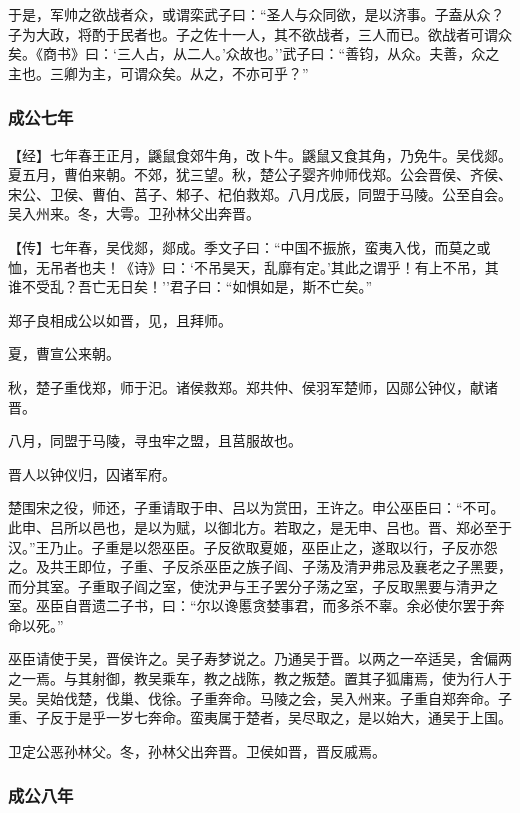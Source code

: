 \documentclass[]{article}
\begin{document}
于是，军帅之欲战者众，或谓栾武子曰：``圣人与众同欲，是以济事。子盍从众？子为大政，将酌于民者也。子之佐十一人，其不欲战者，三人而已。欲战者可谓众矣。《商书》曰：`三人占，从二人。'众故也。''武子曰：``善钧，从众。夫善，众之主也。三卿为主，可谓众矣。从之，不亦可乎？''

\hypertarget{header-n1612}{%
\subsubsection{成公七年}\label{header-n1612}}

【经】七年春王正月，鼷鼠食郊牛角，改卜牛。鼷鼠又食其角，乃免牛。吴伐郯。夏五月，曹伯来朝。不郊，犹三望。秋，楚公子婴齐帅师伐郑。公会晋侯、齐侯、宋公、卫侯、曹伯、莒子、邾子、杞伯救郑。八月戊辰，同盟于马陵。公至自会。吴入州来。冬，大雩。卫孙林父出奔晋。

【传】七年春，吴伐郯，郯成。季文子曰：``中国不振旅，蛮夷入伐，而莫之或恤，无吊者也夫！《诗》曰：`不吊昊天，乱靡有定。'其此之谓乎！有上不吊，其谁不受乱？吾亡无日矣！''君子曰：``如惧如是，斯不亡矣。''

郑子良相成公以如晋，见，且拜师。

夏，曹宣公来朝。

秋，楚子重伐郑，师于汜。诸侯救郑。郑共仲、侯羽军楚师，囚郧公钟仪，献诸晋。

八月，同盟于马陵，寻虫牢之盟，且莒服故也。

晋人以钟仪归，囚诸军府。

楚围宋之役，师还，子重请取于申、吕以为赏田，王许之。申公巫臣曰：``不可。此申、吕所以邑也，是以为赋，以御北方。若取之，是无申、吕也。晋、郑必至于汉。''王乃止。子重是以怨巫臣。子反欲取夏姬，巫臣止之，遂取以行，子反亦怨之。及共王即位，子重、子反杀巫臣之族子阎、子荡及清尹弗忌及襄老之子黑要，而分其室。子重取子阎之室，使沈尹与王子罢分子荡之室，子反取黑要与清尹之室。巫臣自晋遗二子书，曰：``尔以谗慝贪婪事君，而多杀不辜。余必使尔罢于奔命以死。''

巫臣请使于吴，晋侯许之。吴子寿梦说之。乃通吴于晋。以两之一卒适吴，舍偏两之一焉。与其射御，教吴乘车，教之战陈，教之叛楚。置其子狐庸焉，使为行人于吴。吴始伐楚，伐巢、伐徐。子重奔命。马陵之会，吴入州来。子重自郑奔命。子重、子反于是乎一岁七奔命。蛮夷属于楚者，吴尽取之，是以始大，通吴于上国。

卫定公恶孙林父。冬，孙林父出奔晋。卫侯如晋，晋反戚焉。

\hypertarget{header-n1625}{%
\subsubsection{成公八年}\label{header-n1625}}
\end{document}
